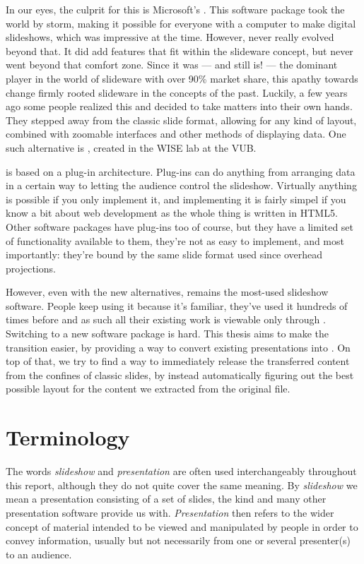   In our eyes, the culprit for this is Microsoft's \ppt. This software package
  took the world by storm, making it possible for everyone with a computer to
  make digital slideshows, which was impressive at the time. However, \ppt*
  never really evolved beyond that. It did add features that fit within the
  slideware concept, but never went beyond that comfort zone. Since it was ---
  and still is! --- the dominant player in the world of slideware with over
  90\% market share, this apathy towards change firmly rooted slideware in the
  concepts of the past. Luckily, a few years ago some people realized this and
  decided to take matters into their own hands. They stepped away from the
  classic slide format, allowing for any kind of layout, combined with zoomable
  interfaces and other methods of displaying data. One such alternative is
  \mxp, created in the WISE lab at the VUB.

  \mxp is based on a plug-in architecture. Plug-ins can do anything from
  arranging data in a certain way to letting the audience control the
  slideshow. Virtually anything is possible if you only implement it, and
  implementing it is fairly simpel if you know a bit about web development as
  the whole thing is written in HTML5. Other software packages have plug-ins
  too of course, but they have a limited set of functionality available to
  them, they're not as easy to implement, and most importantly: they're bound
  by the same slide format used since overhead projections.

  However, even with the new alternatives, \ppt* remains the most-used slideshow
  software. People keep using it because it's familiar, they've used it
  hundreds of times before and as such all their existing work is viewable only
  through \ppt. Switching to a new software package is hard. This thesis aims
  to make the transition easier, by providing a way to convert existing \ppt
  presentations into \mxp. On top of that, we try to find a way to immediately
  release the transferred content from the confines of classic slides, by
  instead automatically figuring out the best possible layout for the content
  we extracted from the original \ppt file.

  \section{Terminology}


   The words \emph{slideshow} and \emph{presentation} are often used
   interchangeably throughout this report, although they do not quite cover the
   same meaning. By \emph{slideshow} we mean a presentation consisting of a set
   of slides, the kind \ppt* and many other presentation software provide us
   with. \emph{Presentation} then refers to the wider concept of material
   intended to be viewed and manipulated by people in order to convey
   information, usually but not necessarily from one or several presenter(s) to
   an audience.

